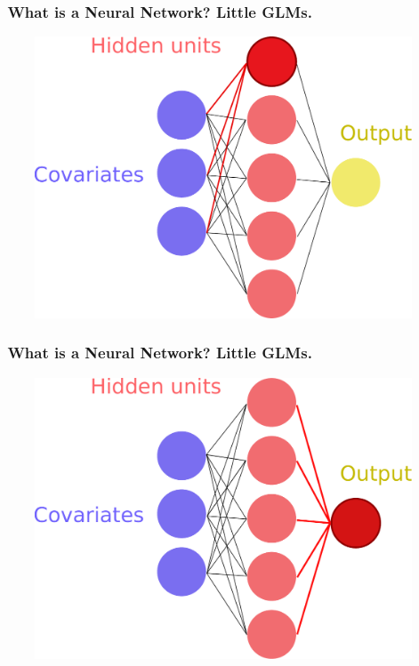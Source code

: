 \documentclass[handout, aspectratio = 169]{beamer}
\begin{document}
\begin{frame}
\frametitle{\insertframenumber~What is a Neural Network? Little GLMs.}

\vspace{6mm}
\begin{figure}
    \includegraphics[height = 0.7\textheight]{neural_network2.pdf}
\end{figure} 
\end{frame} 


\begin{frame}
\frametitle{\insertframenumber~What is a Neural Network? Little GLMs.}

\vspace{6mm}
\begin{figure}
    \includegraphics[height = 0.7\textheight]{neural_network3.pdf}
\end{figure} 
\end{frame} 
\end{document}
